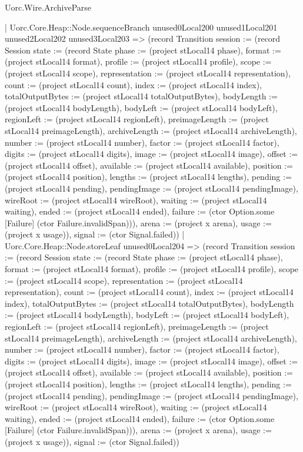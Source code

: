 \begin{lexlean}{Uorc.Wire.ArchiveParse}
\begin{semanticmodule}
{            | Uorc.Core.Heap::Node.sequenceBranch unused0Local200 unused1Local201 unused2Local202 unused3Local203 => (record Transition {session := (record Session {state := (record State {phase := (project stLocal14 phase), format := (project stLocal14 format), profile := (project stLocal14 profile), scope := (project stLocal14 scope), representation := (project stLocal14 representation), count := (project stLocal14 count), index := (project stLocal14 index), totalOutputBytes := (project stLocal14 totalOutputBytes), bodyLength := (project stLocal14 bodyLength), bodyLeft := (project stLocal14 bodyLeft), regionLeft := (project stLocal14 regionLeft), preimageLength := (project stLocal14 preimageLength), archiveLength := (project stLocal14 archiveLength), number := (project stLocal14 number), factor := (project stLocal14 factor), digits := (project stLocal14 digits), image := (project stLocal14 image), offset := (project stLocal14 offset), available := (project stLocal14 available), position := (project stLocal14 position), lengths := (project stLocal14 lengths), pending := (project stLocal14 pending), pendingImage := (project stLocal14 pendingImage), wireRoot := (project stLocal14 wireRoot), waiting := (project stLocal14 waiting), ended := (project stLocal14 ended), failure := (ctor Option.some [Failure] (ctor Failure.invalidSpan))}), arena := (project x arena), usage := (project x usage)}), signal := (ctor Signal.failed)})
            | Uorc.Core.Heap::Node.storeLeaf unused0Local204 => (record Transition {session := (record Session {state := (record State {phase := (project stLocal14 phase), format := (project stLocal14 format), profile := (project stLocal14 profile), scope := (project stLocal14 scope), representation := (project stLocal14 representation), count := (project stLocal14 count), index := (project stLocal14 index), totalOutputBytes := (project stLocal14 totalOutputBytes), bodyLength := (project stLocal14 bodyLength), bodyLeft := (project stLocal14 bodyLeft), regionLeft := (project stLocal14 regionLeft), preimageLength := (project stLocal14 preimageLength), archiveLength := (project stLocal14 archiveLength), number := (project stLocal14 number), factor := (project stLocal14 factor), digits := (project stLocal14 digits), image := (project stLocal14 image), offset := (project stLocal14 offset), available := (project stLocal14 available), position := (project stLocal14 position), lengths := (project stLocal14 lengths), pending := (project stLocal14 pending), pendingImage := (project stLocal14 pendingImage), wireRoot := (project stLocal14 wireRoot), waiting := (project stLocal14 waiting), ended := (project stLocal14 ended), failure := (ctor Option.some [Failure] (ctor Failure.invalidSpan))}), arena := (project x arena), usage := (project x usage)}), signal := (ctor Signal.failed)})
}
\end{semanticmodule}
\end{lexlean}
